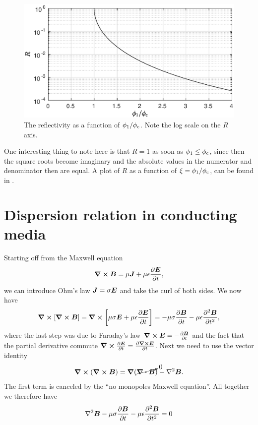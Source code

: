 \documentclass[11pt,letter, swedish, english
]{article}
\begin{document}
\begin{figure}
\centering
\includegraphics[width=.7\textwidth]{3d_R.eps}
\caption{The reflectivity as a function of $\phi_1/\phi_\text{c}$. Note the
  log scale on the $R$ axis.}
\label{fig:3d_R}
\end{figure}

One interesting thing to note here is that $R=1$ as soon as
$\phi_1\le\phi_\text{c}$, since then the square roots become imaginary and the
absolute values in the numerator and denominator then are equal. 
A plot of $R$ as a function of $\xi=\phi_1/\phi_\text{c}$, can be found in
. 




\section{Dispersion relation in conducting media}
Starting off from the Maxwell equation
\begin{equation}
\curl\vb*B = \mu\vb*J + \mu\epsilon\pdv{\vb*E}{t},
\end{equation}
we can introduce Ohm's law $\vb*J=\sigma\vb*E$ and take the curl of
both sides. We now have
\begin{equation}\label{eq:4_wave-eqn}
\curl[\curl\vb*B] = 
\curl\qty[\mu\sigma\vb*E + \mu\epsilon\pdv{\vb*E}{t}]
=-\mu\sigma\pdv{\vb*B}{t} - \mu\epsilon\pdv[2]{\vb*B}{t},
\end{equation}
where the last step was due to Faraday's law 
$\curl\vb*E = -\pdv{\vb*B}{t}$ and the fact that the partial
derivative commute $\curl\pdv{\vb*E}{t} = \pdv{\curl\vb*E}{t}$. 
Next we need to use the vector identity
\begin{equation}
\curl(\curl\vb*B) = \grad{}(\cancelto{0}{\div\vb*B}) - \laplacian\vb*B.
\end{equation}
The first term is canceled by the ``no monopoles Maxwell
equation''. All together we therefore have
\begin{equation}\label{eq:4_wave-eqn}
\laplacian\vb*B
-\mu\sigma\pdv{\vb*B}{t} - \mu\epsilon\pdv[2]{\vb*B}{t} =0
\end{equation}
\end{document}
